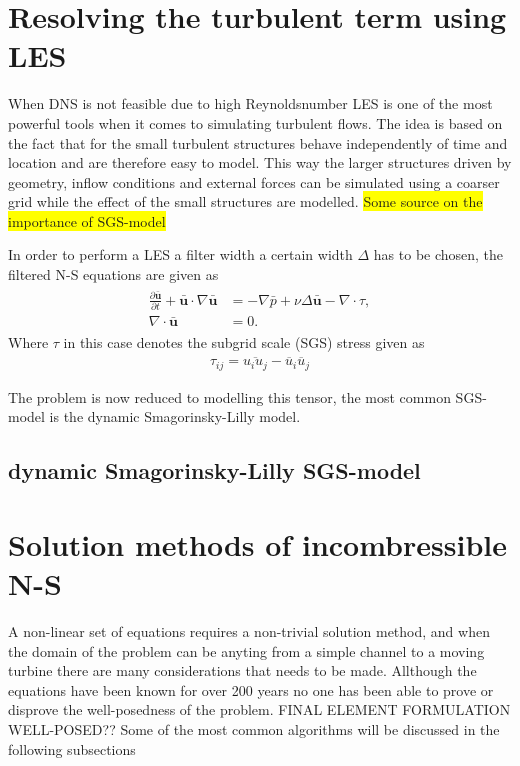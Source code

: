 \section{Resolving the turbulent term using LES}
When DNS is not feasible due to high Reynoldsnumber LES is one of the most powerful tools when it comes to simulating turbulent flows.
The idea is based on the fact that for the small turbulent structures behave independently of time and location and are therefore 
easy to model. This way the larger structures driven by geometry, inflow conditions and external forces can be simulated using a coarser 
grid while the effect of the small structures are modelled. \colorbox{yellow}{Some source on the importance of SGS-model}

In order to perform a LES a filter width a certain width $\Delta$ has to be chosen, 
the filtered N-S equations are given as 
%
\begin{align}
    \begin{split}
        \frac{\partial \mathbf{\bar{u}}}{\partial t} + \mathbf{\bar{u}}\cdot \nabla\mathbf{\bar{u}}
        &= -\nabla \bar{p} +\nu\Delta \mathbf{\bar{u}}-\nabla \cdot \tau, \\
        \nabla \cdot \mathbf{\bar{u}} &= 0.
    \end{split}
	\label{eq:NSfiltered}
\end{align}
%
Where $\tau$ in this case denotes the subgrid scale (SGS) stress given as 
\begin{align}
    \tau_{ij} = \overline{u_iu_j}-\overline{u}_i \overline{u}_j
    \label{eq:sgstensor}
\end{align}

The problem is now reduced to modelling this tensor, the most common SGS-model is the 
dynamic Smagorinsky-Lilly model.
\subsection{dynamic Smagorinsky-Lilly SGS-model}

\section{Solution methods of incombressible N-S}
A non-linear set of equations requires a non-trivial solution method, and when the domain of the problem can be anyting from a simple channel 
to a moving turbine there are many considerations that needs to be made. Allthough the equations have been known for over 200 years no one 
has been able to prove or disprove the well-posedness of the problem. FINAL ELEMENT FORMULATION WELL-POSED?? Some of the most common algorithms 
will be discussed in the following subsections

